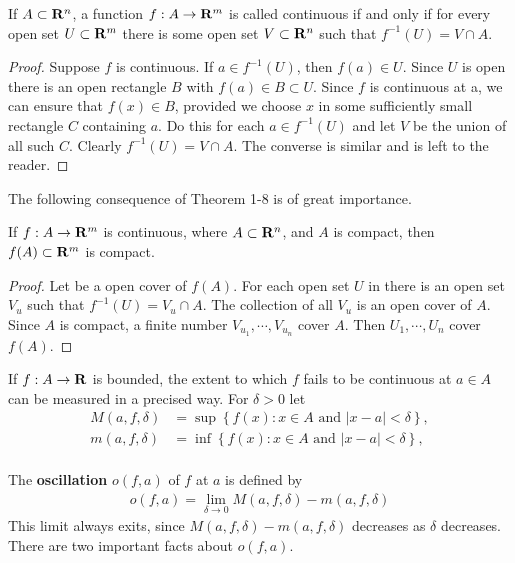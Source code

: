 \begin{theorem}
    If $A\subset \mathbf{R}^n$, a function $f:A\to \mathbf{R}^m$ is called continuous if and only if 
    for every open set $U\subset \mathbf{R}^m$ there is some open set $V\subset \mathbf{R}^n$ such that $f^{-1}(U) = V\cap A$.
\end{theorem}

\begin{proof}
    Suppose $f$ is continuous. If $a\in f^{-1}(U)$, then $f(a)\in U$. Since $U$ is open there is an open rectangle
    $B$ with $f(a)\in B\subset U$. Since $f$ is continuous at a, we can ensure that $f(x)\in B$, provided we choose 
    $x$ in some sufficiently small rectangle $C$ containing $a$. Do this for each $a\in f^{-1}(U)$ and let $V$ be the 
    union of all such $C$. Clearly $f^{-1}(U) = V\cap A$. The converse is similar and is left to the reader.
\end{proof}

The following consequence of Theorem 1-8 is of great importance. 

\begin{theorem}
    If $f:A\to \mathbf{R}^m$ is continuous, where $A\subset \mathbf{R}^n$, and $A$ is compact, then 
    $f(A) \subset \mathbf{R}^m$ is compact.
\end{theorem}

\begin{proof}
    Let  be a open cover of $f(A)$. For each open set $U$ in  there is an open set $V_u$ such that 
    $f^{-1}(U) = V_u\cap A$. The collection of all $V_u$ is an open cover of $A$. Since $A$ is compact, a finite 
    number $V_{u_1},\cdots, V_{u_n}$ cover $A$. Then $U_1, \cdots, U_n$ cover $f(A)$.
\end{proof}

If $f:A\to \mathbf{R}$ is bounded, the extent to which $f$ fails to be continuous at $a\in A$ can be measured in a precised 
way. For $\delta >0$ let 
\begin{align*}
    M(a, f, \delta) & = \sup\left\{f(x):x\in A\text{ and } |x-a|< \delta\right\}, \\
    m(a, f, \delta) & = \inf\left\{f(x):x\in A\text{ and } |x-a|< \delta\right\}, \\
\end{align*}

The \textbf{oscillation} $o(f, a)$ of $f$ at $a$ is defined by 
\begin{align*}
    o(f, a) = \lim_{\delta \to 0 }{M(a, f, \delta) - m(a, f, \delta)}
\end{align*}
This limit always exits, since $M(a, f, \delta) - m(a, f, \delta)$ decreases as $\delta$ decreases. There are two 
important facts about $o(f, a)$.

